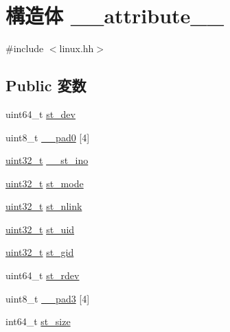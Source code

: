 \hypertarget{structX86Linux32_1_1____attribute____}{
\section{構造体 \_\-\_\-attribute\_\-\_\-}
\label{structX86Linux32_1_1____attribute____}
}


{\ttfamily \#include $<$linux.hh$>$}\subsection*{Public 変数}
\begin{DoxyCompactItemize}
\item 
uint64\_\-t \hyperlink{structX86Linux32_1_1____attribute_____a0146849d3da5c91d9776888b14b82dcc}{st\_\-dev}
\item 
uint8\_\-t \hyperlink{structX86Linux32_1_1____attribute_____aa4a5de741123aaa486dc46b3524f737e}{\_\-\_\-pad0} \mbox{[}4\mbox{]}
\item 
\hyperlink{Type_8hh_a435d1572bf3f880d55459d9805097f62}{uint32\_\-t} \hyperlink{structX86Linux32_1_1____attribute_____a1c82ff0077a6433da883f68ac3d4f765}{\_\-\_\-st\_\-ino}
\item 
\hyperlink{Type_8hh_a435d1572bf3f880d55459d9805097f62}{uint32\_\-t} \hyperlink{structX86Linux32_1_1____attribute_____a75f55d064ed3b380b0315de36e178885}{st\_\-mode}
\item 
\hyperlink{Type_8hh_a435d1572bf3f880d55459d9805097f62}{uint32\_\-t} \hyperlink{structX86Linux32_1_1____attribute_____ab77c257c135fa586e930ef0bf0977c08}{st\_\-nlink}
\item 
\hyperlink{Type_8hh_a435d1572bf3f880d55459d9805097f62}{uint32\_\-t} \hyperlink{structX86Linux32_1_1____attribute_____ad5477a292a4edf27aa5766e01e0f5d1f}{st\_\-uid}
\item 
\hyperlink{Type_8hh_a435d1572bf3f880d55459d9805097f62}{uint32\_\-t} \hyperlink{structX86Linux32_1_1____attribute_____a1faa6012541b83fd5218e2b229f876ec}{st\_\-gid}
\item 
uint64\_\-t \hyperlink{structX86Linux32_1_1____attribute_____ac430407fd3b0e421da1ee8f66c95a786}{st\_\-rdev}
\item 
uint8\_\-t \hyperlink{structX86Linux32_1_1____attribute_____a07f139d788e07af72dd7ccd404111d0e}{\_\-\_\-pad3} \mbox{[}4\mbox{]}
\item 
int64\_\-t \hyperlink{structX86Linux32_1_1____attribute_____aec608d79c93ed6d010aec9f7487e0064}{st\_\-size}
\item 

\end{DoxyCompactItemize}
